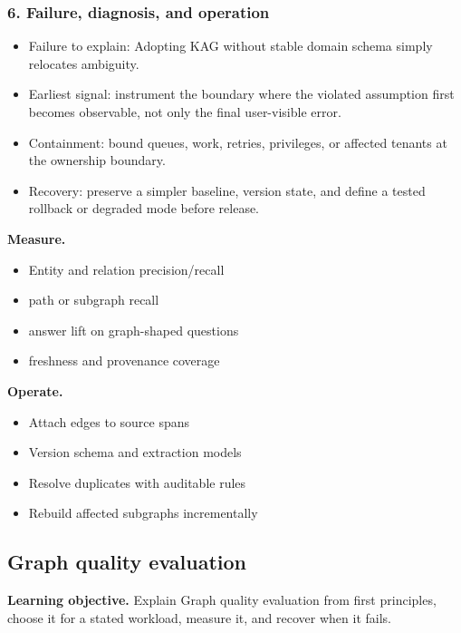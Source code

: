 \subsubsection*{6. Failure, diagnosis, and operation}
\begin{itemize}
\item Failure to explain: Adopting KAG without stable domain schema simply relocates ambiguity.
\item Earliest signal: instrument the boundary where the violated assumption first becomes observable, not only the final user-visible error.
\item Containment: bound queues, work, retries, privileges, or affected tenants at the ownership boundary.
\item Recovery: preserve a simpler baseline, version state, and define a tested rollback or degraded mode before release.
\end{itemize}
\textbf{Measure.}\begin{itemize}
\item Entity and relation precision/recall
\item path or subgraph recall
\item answer lift on graph-shaped questions
\item freshness and provenance coverage
\end{itemize}
\textbf{Operate.}\begin{itemize}
\item Attach edges to source spans
\item Version schema and extraction models
\item Resolve duplicates with auditable rules
\item Rebuild affected subgraphs incrementally
\end{itemize}
\subsection{Graph quality evaluation}
\textbf{Learning objective.} Explain Graph quality evaluation from first principles, choose it for a stated workload, measure it, and recover when it fails.
